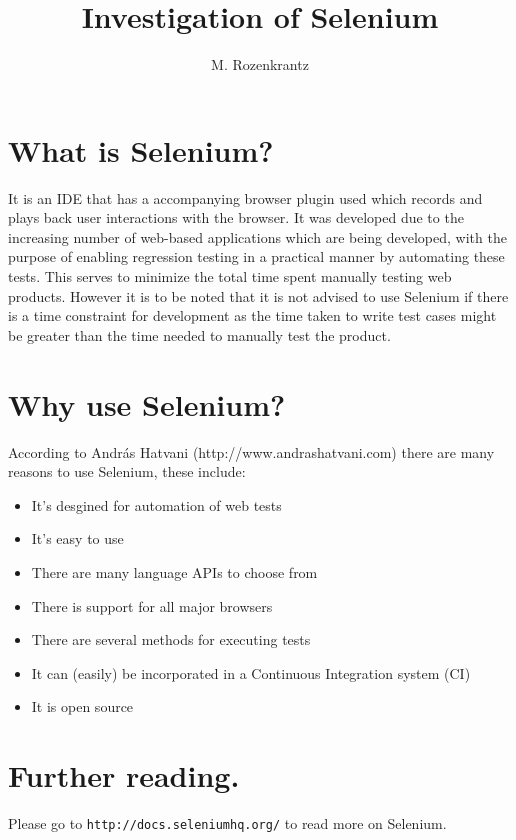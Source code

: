 \documentclass{article}
\title{Investigation of Selenium}
\author{M. Rozenkrantz}
\date{}
\begin{document}
\maketitle

\section{What is Selenium?}
It is an IDE that has a accompanying browser plugin used which records and plays back user interactions with the browser. It was developed due to the increasing number of web-based applications which are being developed, with the purpose of enabling regression testing in a practical manner by automating these tests. This serves to minimize the total time spent manually testing web products. However it is to be noted that it is not advised to use Selenium if there is a time constraint for development as the time taken to write test cases might be greater than the time needed to manually test the product.

\section{Why use Selenium?}
According to András Hatvani (http://www.andrashatvani.com) there are many reasons to use Selenium, these include:
\begin{itemize}
\item{It's desgined for automation of web tests}
\item{It's easy to use}
\item{There are many language APIs to choose from}
\item{There is support for all major browsers}
\item{There are several methods for executing tests}
\item{It can (easily) be incorporated in a Continuous Integration system (CI)}
\item{It is open source}
\end{itemize}


\section{Further reading.}
Please go to \verb#http://docs.seleniumhq.org/# to read more on Selenium.
\end{document}
